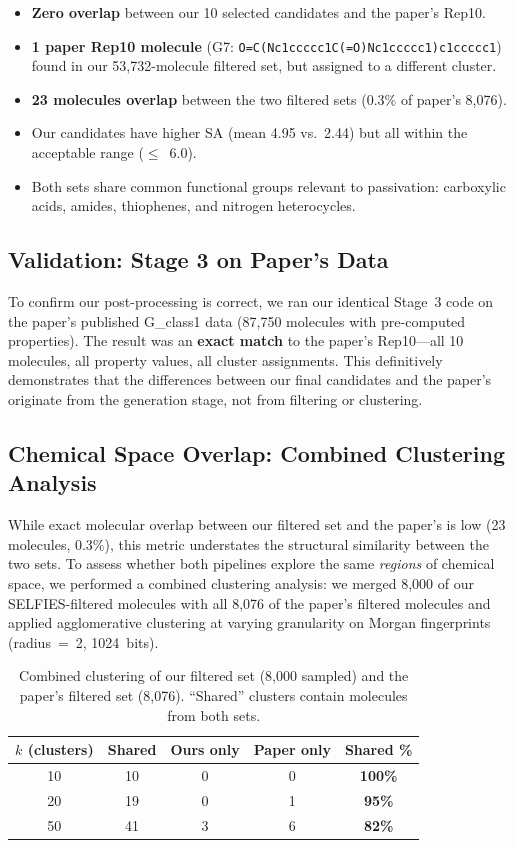 \documentclass[11pt,a4paper]{article}
\begin{document}
\begin{itemize}[nosep]
    \item \textbf{Zero overlap} between our 10 selected candidates and the paper's Rep10.
    \item \textbf{1 paper Rep10 molecule} (G7: \texttt{O=C(Nc1ccccc1C(=O)Nc1ccccc1)c1ccccc1}) found in our 53,732-molecule filtered set, but assigned to a different cluster.
    \item \textbf{23 molecules overlap} between the two filtered sets (0.3\% of paper's 8,076).
    \item Our candidates have higher SA (mean 4.95 vs.\ 2.44) but all within the acceptable range ($\leq$~6.0).
    \item Both sets share common functional groups relevant to passivation: carboxylic acids, amides, thiophenes, and nitrogen heterocycles.
\end{itemize}

\subsection{Validation: Stage 3 on Paper's Data}

To confirm our post-processing is correct, we ran our identical Stage~3 code on the paper's published G\_class1 data (87,750 molecules with pre-computed properties). The result was an \textbf{exact match} to the paper's Rep10---all 10 molecules, all property values, all cluster assignments. This definitively demonstrates that the differences between our final candidates and the paper's originate from the generation stage, not from filtering or clustering.

\subsection{Chemical Space Overlap: Combined Clustering Analysis}
\label{sec:cluster_overlap}

While exact molecular overlap between our filtered set and the paper's is low (23 molecules, 0.3\%), this metric understates the structural similarity between the two sets. To assess whether both pipelines explore the same \textit{regions} of chemical space, we performed a combined clustering analysis: we merged 8,000 of our SELFIES-filtered molecules with all 8,076 of the paper's filtered molecules and applied agglomerative clustering at varying granularity on Morgan fingerprints (radius~=~2, 1024~bits).

\begin{table}[H]
\centering
\caption{Combined clustering of our filtered set (8,000 sampled) and the paper's filtered set (8,076). ``Shared'' clusters contain molecules from both sets.}
\label{tab:cluster_overlap}
\begin{tabular}{ccccc}
\toprule
$k$ (clusters) & Shared & Ours only & Paper only & Shared \% \\
\midrule
10 & 10 & 0 & 0 & \textbf{100\%} \\
20 & 19 & 0 & 1 & \textbf{95\%} \\
50 & 41 & 3 & 6 & \textbf{82\%} \\
\bottomrule
\end{tabular}
\end{table}
\end{document}

